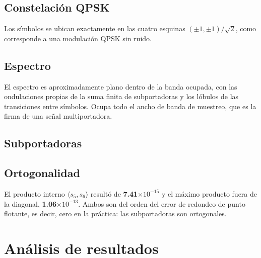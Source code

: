 \documentclass[11pt,a4paper]{article}
\begin{document}
\subsection{Constelación QPSK}


Los símbolos se ubican exactamente en las cuatro esquinas $(\pm1,\pm1)/\sqrt{2}$, como
corresponde a una modulación QPSK sin ruido.

\subsection{Espectro}


El espectro es aproximadamente plano dentro de la banda ocupada, con las ondulaciones
propias de la suma finita de subportadoras y los lóbulos de las transiciones entre
símbolos. Ocupa todo el ancho de banda de muestreo, que es la firma de una señal
multiportadora.

\subsection{Subportadoras}


\subsection{Ortogonalidad}


El producto interno $\langle s_5,s_6\rangle$ resultó de \textbf{7.41$\times10^{-15}$} y el
máximo producto fuera de la diagonal, \textbf{1.06$\times10^{-13}$}. Ambos son del orden
del error de redondeo de punto flotante, es decir, cero en la práctica: las subportadoras
son ortogonales.

\section{Análisis de resultados}
\end{document}
